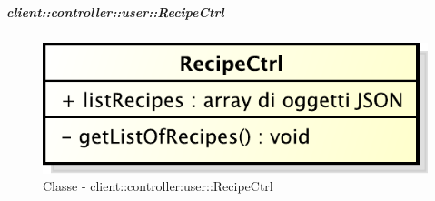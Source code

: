 		\subparagraph{client::controller::user::RecipeCtrl} %
		\label{subp:client_controller_user_recipectrl}
			\begin{figure}[htbp]
				\centering
				\centerline{\includegraphics[scale=0.7]{./images/client/classes/controller/recipe_ctrl.pdf}}
				\caption{Classe - client::controller:user::RecipeCtrl}
			\end{figure}
